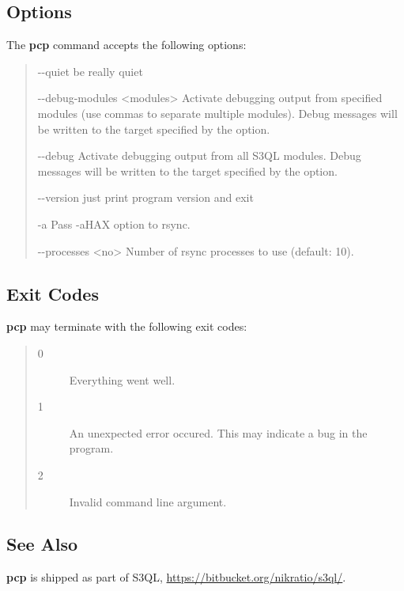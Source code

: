 \documentclass[letterpaper,10pt,english]{sphinxmanual}
\begin{document}
\subsection{Options}
\label{man/pcp:options}
The \textbf{pcp} command accepts the following options:
\begin{quote}
\begin{optionlist}{3cm}
\item [-{-}quiet]  
be really quiet
\item [-{-}debug-modules \textless{}modules\textgreater{}]  
Activate debugging output from specified modules (use
commas to separate multiple modules). Debug messages
will be written to the target specified by the
 option.
\item [-{-}debug]  
Activate debugging output from all S3QL modules. Debug
messages will be written to the target specified by
the  option.
\item [-{-}version]  
just print program version and exit
\item [-a]  
Pass -aHAX option to rsync.
\item [-{-}processes \textless{}no\textgreater{}]  
Number of rsync processes to use (default: 10).
\end{optionlist}
\end{quote}


\subsection{Exit Codes}
\label{man/pcp:exit-codes}
\textbf{pcp} may terminate with the following exit codes:
\begin{quote}\begin{description}
\item[{0}] \leavevmode
Everything went well.

\item[{1}] \leavevmode
An unexpected error occured. This may indicate a bug in the
program.

\item[{2}] \leavevmode
Invalid command line argument.

\end{description}\end{quote}


\subsection{See Also}
\label{man/pcp:see-also}
\textbf{pcp} is shipped as part of S3QL, \href{https://bitbucket.org/nikratio/s3ql/}{https://bitbucket.org/nikratio/s3ql/}.
\end{document}
